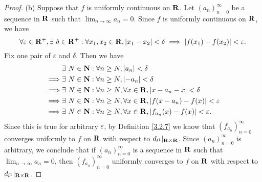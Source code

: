 \begin{proof}{(b)}
    Suppose that \(f\) is uniformly continuous on \(\mathbf{R}\).
    Let \((a_n)_{n = 0}^\infty\) be a sequence in \(\mathbf{R}\) such that \(\lim_{n \to \infty} a_n = 0\).
    Since \(f\) is uniformly continuous on \(\mathbf{R}\), we have
    \[
        \forall \varepsilon \in \R^+, \exists\ \delta \in \R^+ : \forall x_1, x_2 \in \R, \abs{x_1 - x_2} < \delta \implies \abs{f(x_1) - f(x_2)} < \varepsilon.
    \]
    Fix one pair of \(\varepsilon\) and \(\delta\).
    Then we have
    \begin{align*}
                 & \exists\ N \in \mathbf{N} : \forall n \geq N, \left\lvert a_n\right\rvert < \delta                                       \\
        \implies & \exists\ N \in \mathbf{N} : \forall n \geq N, \left\lvert-a_n\right\rvert < \delta                                      \\
        \implies & \exists\ N \in \mathbf{N} : \forall n \geq N, \forall x \in \mathbf{R}, \left\lvert x - a_n - x\right\rvert < \delta             \\
        \implies & \exists\ N \in \mathbf{N} : \forall n \geq N, \forall x \in \mathbf{R}, \left\lvert f(x - a_n) - f(x)\right\rvert < \varepsilon  \\
        \implies & \exists\ N \in \mathbf{N} : \forall n \geq N, \forall x \in \mathbf{R}, \left\lvert f_{a_n}(x) - f(x)\right\rvert < \varepsilon.
    \end{align*}
    Since this is true for arbitrary \(\varepsilon\), by Definition \ref{3.2.7} we know that \((f_{a_n})_{n = 0}^\infty\) converges uniformly to \(f\) on \(\mathbf{R}\) with respect to \(d_{l^1}|_{\mathbf{R} \times \mathbf{R}}\).
    Since \((a_n)_{n = 0}^\infty\) is arbitrary, we conclude that if \((a_n)_{n = 0}^\infty\) is a sequence in \(\mathbf{R}\) such that \(\lim_{n \to \infty} a_n = 0\), then \((f_{a_n})_{n = 0}^\infty\) uniformly converges to \(f\) on \(\mathbf{R}\) with respect to \(d_{l^1}|_{\mathbf{R} \times \mathbf{R}}\).


\end{proof}
